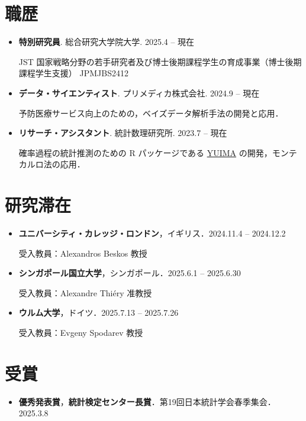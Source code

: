 \documentclass[
  11pt,
]{article}
\providecommand{\tightlist}{%
  \setlength{\itemsep}{0pt}\setlength{\parskip}{0pt}}\usepackage{longtable,booktabs,array}
\renewcommand{\labelitemi}{\textcolor{minty}{\faCheckCircle}} %
\begin{document}
\section{職歴}\label{ux8077ux6b74}

\renewcommand{\labelitemi}{\textcolor{minty}{\faSuitcase}}

\begin{itemize}
\item
  \textbf{特別研究員}. 総合研究大学院大学. \hfill {2025.4 -- 現在}

  JST
  国家戦略分野の若⼿研究者及び博⼠後期課程学⽣の育成事業（博⼠後期課程学⽣⽀援）
  JPMJBS2412
\item
  \textbf{データ・サイエンティスト}. プリメディカ株式会社.
  \hfill {2024.9 -- 現在}

  予防医療サービス向上のための，ベイズデータ解析手法の開発と応用．
\item
  \textbf{リサーチ・アシスタント}. 統計数理研究所. \hfill {2023.7 --
  現在}

  確率過程の統計推測のための R パッケージである
  \href{https://r-forge.r-project.org/projects/yuima/}{YUIMA}
  の開発，モンテカルロ法の応用．
\end{itemize}

\section{研究滞在}\label{ux7814ux7a76ux6edeux5728}

\renewcommand{\labelitemi}{\textcolor{minty}{\faUniversity}}

\begin{itemize}
\item
  \textbf{ユニバーシティ・カレッジ・ロンドン}，イギリス．\hfill {2024.11.4
  -- 2024.12.2}

  受入教員：Alexandros Beskos 教授
\item
  \textbf{シンガポール国立大学}，シンガポール．\hfill {2025.6.1 --
  2025.6.30}

  受入教員：Alexandre Thiéry 准教授
\item
  \textbf{ウルム大学}，ドイツ．\hfill {2025.7.13 -- 2025.7.26}

  受入教員：Evgeny Spodarev 教授
\end{itemize}

\section{受賞}\label{ux53d7ux8cde}

\renewcommand{\labelitemi}{\textcolor{minty}{\faThumbsUp}}

\begin{itemize}
\tightlist
\item
  \textbf{優秀発表賞}，\textbf{統計検定センター長賞}．第19回日本統計学会春季集会．\hfill {2025.3.8}
\end{itemize}

\renewcommand{\labelitemi}{\textcolor{minty}{\faBookmark}}
\end{document}
